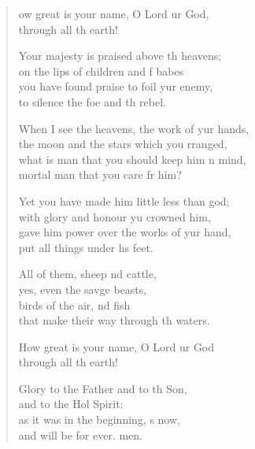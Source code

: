 \settowidth{\versewidth}{When I see the heavens, the work of your hands, *}
\begin{verse}%
  \begin{patverse}

ow great is your name, O Lord ur God,\Med\\
through all th earth!

Your majesty is praised above th heavens;\Med\\
on the lips of children and f babes\\
you have found praise to foil yur enemy,\Med\\
to silence the foe and th rebel.

When I see the heavens, the work of yur hands,\Med\\
the moon and the stars which you rranged,\\
what is man that you should keep him \pointup{\i}n mind,\Med\\
mortal man that you care fr him?

Yet you have made him little less than  god;\Med\\
with glory and honour yu crowned him,\\
gave him power over the works of yur hand,\Med\\
put all things under h\pointup{\i}s feet.

All of them, sheep nd cattle,\Med\\
yes, even the savge beasts,\\
birds of the air, nd fish\Med\\
that make their way through th waters.

How great is your name, O Lord ur God\Med\\
through all th earth!

Glory to the Father and to th Son,\Med\\
and to the Hol Spirit:\\
as it was in the beginning, \pointup{\i}s now,\Med\\
and will be for ever. men.
  \end{patverse}
  \end{verse}
